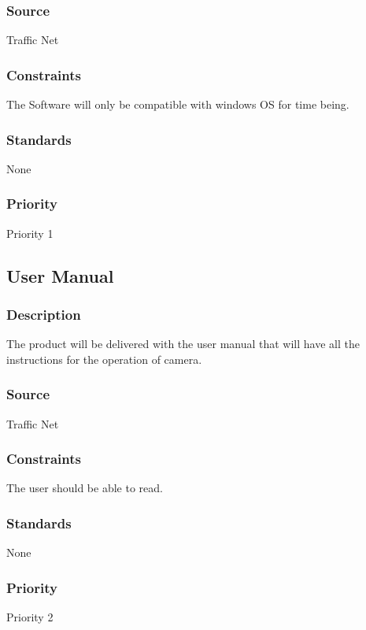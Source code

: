 \subsubsection{Source}
Traffic Net
\subsubsection{Constraints}
The Software will only be compatible with windows OS for time being.
\subsubsection{Standards}
None
\subsubsection{Priority}
Priority 1

\subsection{User Manual}
\subsubsection{Description}
The product will be delivered with the user manual that will have all the instructions for the operation of camera.

\subsubsection{Source}
Traffic Net
\subsubsection{Constraints}
The user should be able to read.
\subsubsection{Standards}
None
\subsubsection{Priority}
Priority 2
